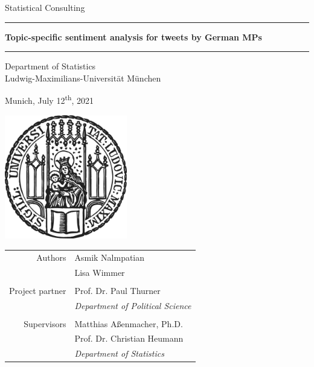 \documentclass[12pt]{article}
\begin{document}


 
\begin{titlepage}
\begin{center}
    
\LARGE
Statistical Consulting
    
\vspace{0.5cm}
      
\rule{\textwidth}{1.5pt}
\Huge
\textbf{Topic-specific sentiment analysis for tweets by German MPs}
\rule{\textwidth}{1.5pt}
   
\vspace{0.5cm}
      
\large
Department of Statistics \\
Ludwig-Maximilians-Universität München 

\vfill

Munich, July 12\textsuperscript{th}, 2021
      
\vfill

\includegraphics[width = 0.4\textwidth]{figures/sigillum.png}

\vfill

\begin{tabular}{rl}
  Authors & Asmik Nalmpatian \\
  & Lisa Wimmer \\
  & \\
  Project partner & Prof. Dr. Paul Thurner \\
  & \textit{Department of Political Science} \\
  & \\
  Supervisors & Matthias Aßenmacher, Ph.D. \\
  & Prof. Dr. Christian Heumann \\
  & \textit{Department of Statistics}
\end{tabular}

\end{center}
\end{titlepage}
\end{document}
